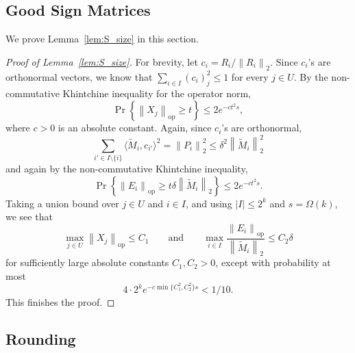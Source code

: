 \documentclass[11pt]{article}
\theoremstyle{remark}
\theoremstyle{definition}
\newcommand{\norm}[1]{\left\|#1\right\|}
\newcommand{\op}{\textrm{op}}
\begin{document}
\subsection{Good Sign Matrices}

We prove Lemma~\ref{lem:S_size} in this section.

\begin{proof}[Proof of Lemma~\ref{lem:S_size}]
For brevity, let $c_i = R_i/\norm{R_i}_2$. Since $c_i$'s are orthonormal vectors, we know that $\sum_{i\in I} (c_i)_j^2\leq 1$ for every $j\in U$. By the non-commutative Khintchine inequality for the operator norm,
\[
	\Pr\left\{ \norm{X_j}_{\op} \geq t \right\} \leq 2e^{-ct^2 s},
\]
where $c>0$ is an absolute constant. Again, since $c_i$'s are orthonormal, 
\[
	\sum_{i'\in I\setminus\{i\}} \langle \widetilde{M}_i, c_{i'}\rangle^2 = \norm{P_i}_2^2 \leq \delta^2\norm{\widetilde{M}_i}_2^2
\]
and again by the non-commutative Khintchine inequality,
\[
	\Pr\left\{ \norm{E_i}_{\op}\geq t\delta\norm{\widetilde{M}_i}_2 \right\} \leq 2e^{-ct^2 s}.
\]
Taking a union bound over $j\in U$ and $i\in I$, and using $|I|\leq 2^k$ and $s=\Omega(k)$, we see that
\[
	\max_{j\in U} \norm{X_j}_{\op} \leq C_1\qquad\text{and}\qquad \max_{i\in I} \frac{\norm{E_i}_{\op}}{\norm{\widetilde{M}_i}_2} \leq C_2\delta
\]
for sufficiently large absolute constants $C_1, C_2 > 0$, except with probability at most
\[
	4\cdot 2^k e^{-c\min\{C_1^2,C_2^2\}s} < 1/10.
\]
This finishes the proof.
\end{proof}

\subsection{Rounding}\label{sec:rounding}
\end{document}
